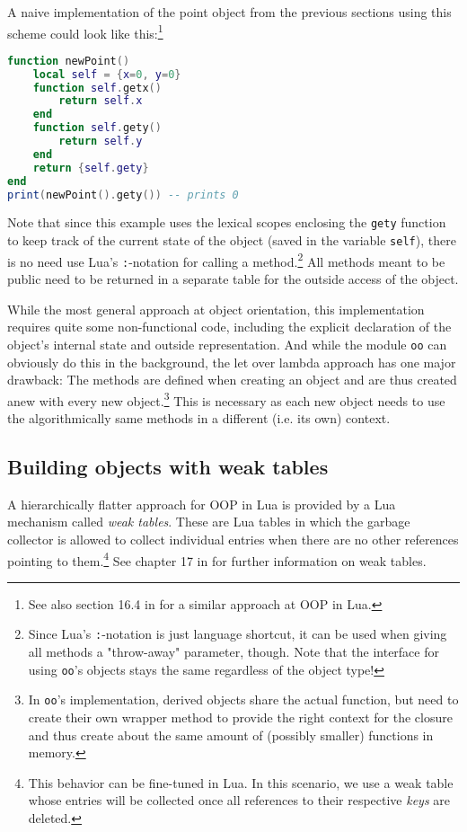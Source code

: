 A naive implementation of the point object from the previous sections using this scheme could look like this:\footnote{See also section 16.4 in \cite{Ierusalimschy2006} for a similar approach at OOP in Lua.}

\begin{lstlisting}[language=lua, caption={Possible implementation of a point object using closures}, label=lst:lol, name=lst:lol]
function newPoint()
	local self = {x=0, y=0}
	function self.getx()
		return self.x
	end
	function self.gety()
		return self.y
	end
	return {self.gety}
end
print(newPoint().gety()) -- prints 0
\end{lstlisting}

Note that since this example uses the lexical scopes enclosing the \texttt{gety} function to keep track of the current state of the object (saved in the variable \texttt{self}), there is no need use Lua's \texttt{:}-notation for calling a method.\footnote{Since Lua's \texttt{:}-notation is just language shortcut, it can be used when giving all methods a "throw-away" parameter, though. Note that the interface for using \texttt{oo}'s objects stays the same regardless of the object type!} All methods meant to be public need to be returned in a separate table for the outside access of the object.

While the most general approach at object orientation, this implementation requires quite some non-functional code, including the explicit declaration of the object's internal state and outside representation. And while the module \texttt{oo} can obviously do this in the background, the let over lambda approach has one major drawback: The methods are defined when creating an object and are thus created anew with every new object.\footnote{In \texttt{oo}'s implementation, derived objects share the actual function, but need to create their own wrapper method to provide the right context for the closure and thus create about the same amount of (possibly smaller) functions in memory.} This is necessary as each new object needs to use the algorithmically same methods in a different (i.e. its own) context.


\subsection{Building objects with weak tables}

A hierarchically flatter approach for OOP in Lua is provided by a Lua mechanism called \emph{weak tables}. These are Lua tables in which the garbage collector is allowed to collect individual entries when there are no other references pointing to them.\footnote{This behavior can be fine-tuned in Lua. In this scenario, we use a weak table whose entries will be collected once all references to their respective \emph{keys} are deleted.} See chapter 17 in \cite{Ierusalimschy2006} for further information on weak tables.

